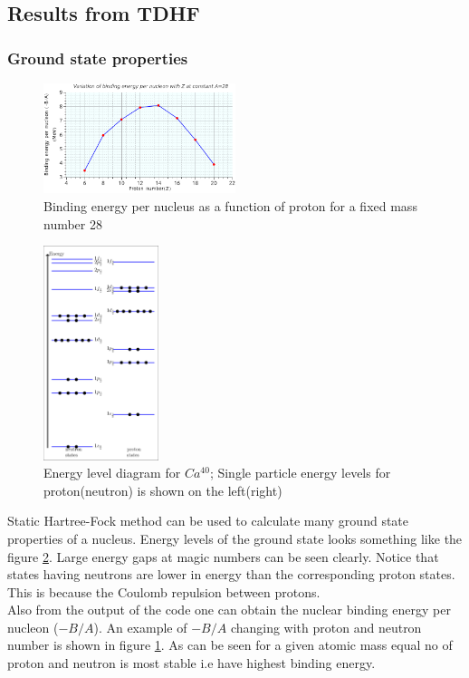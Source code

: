 \documentclass[a4paper]{paper}
\begin{document}
            \subsection{Results from TDHF}
                \subsubsection{Ground state properties}
                    \begin{figure}[H]
                        \centering
                        \includegraphics[width=0.50\textwidth,fbox]{image/BvsZ}
                        \caption{Binding energy per nucleus as a function of proton for a fixed mass number 28}
                        \label{BvsZ}
                    \end{figure}
                    \begin{figure}
                        \centering
                        \includegraphics[width=0.3\textwidth]{image/levelCa40}
                        \caption{Energy level diagram for $Ca^{40}$; Single particle energy levels for proton(neutron) is shown on the left(right)}
                        \label{fig:Ca40level}
                    \end{figure}
                    Static Hartree-Fock method can be used to calculate many ground state properties of a nucleus. Energy levels of the ground state looks something like the figure \ref{fig:Ca40level}. Large energy gaps at magic numbers can be seen clearly. Notice that states having neutrons are lower in energy than the corresponding proton states. This is because the Coulomb repulsion between protons.\\
                    Also from the output of the code one can obtain the nuclear binding energy per nucleon ($-B/A$). An example of $-B/A$ changing with proton and neutron number is shown in figure \ref{BvsZ}. As can be seen for a given atomic mass equal no of proton and neutron is most stable i.e have highest binding energy.
\end{document}
